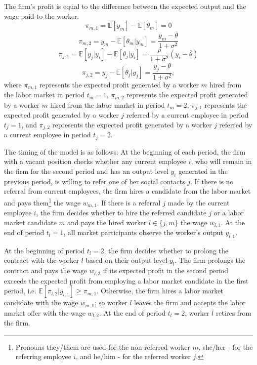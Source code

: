 \documentclass[12pt]{article}
\begin{document}
The firm's profit is equal to the difference between the expected output and the wage paid to the worker.
\begin{equation}\label{eq_pi_m_1}
    \pi_{m,1} = \mathbb{E}[y_m]-\mathbb{E}[\theta_m] = 0
\end{equation}
\begin{equation}\label{eq_pi_m_2}
    \pi_{m,2} = y_m - \mathbb{E}[\theta_m|y_m] = \frac{y_m-\bar{\theta}}{1+\sigma^2}
\end{equation}
\begin{equation}\label{eq_pi_j_1}
    \pi_{j,1} = \mathbb{E}[y_j|y_i]-\mathbb{E}[\theta_j|y_i] = \frac{\rho}{1+\sigma^2}(y_i-\bar{\theta})
\end{equation}
\begin{equation}\label{eq_pi_j_2}
    \pi_{j,2} = y_j - \mathbb{E}[\theta_j|y_j] = \frac{y_j-\bar{\theta}}{1+\sigma^2},
\end{equation}
where $\pi_{m,1}$ represents the expected profit generated by a worker $m$ hired from the labor market in period $t_m = 1$, $\pi_{m,2}$ represents the expected profit generated by a worker $m$ hired from the labor market in period $t_m = 2$, $\pi_{j,1}$ represents the expected profit generated by a worker $j$ referred by a current employee in period $t_j = 1$, and $\pi_{j,2}$ represents the expected profit generated by a worker $j$ referred by a current employee in period $t_j = 2$.

The timing of the model is as follows: At the beginning of each period, the firm with a vacant position checks whether any current employee $i$, who will remain in the firm for the second period and has an output level $y_i$ generated in the previous period, is willing to refer one of her social contacts $j$. If there is no referral from current employees, the firm hires a candidate from the labor market and pays them\footnote{Pronouns they/them are used for the non-referred worker $m$, she/her - for the referring employee $i$, and he/him - for the referred worker $j$.} the wage $w_{m,1}$. If there is a referral $j$ made by the current employee $i$, the firm decides whether to hire the referred candidate $j$ or a labor market candidate $m$ and pays the hired worker $l \in \lbrace j,m \rbrace$ the wage $w_{l,1}$. At the end of period $t_l = 1$, all market participants observe  the worker's output $y_{l,1}$. %

At the beginning of period $t_l =2$, the firm decides whether to prolong the contract with the worker $l$ based on their output level $y_l$. The firm prolongs the contract and pays the wage $w_{l,2}$ if its expected profit in the second period exceeds the expected profit from employing a labor market candidate in the first period, i.e. $\mathbb{E}[\pi_{l,2}|y_{l,1}] \geq \pi_{m,1}$. Otherwise, the firm hires a labor market candidate with the wage $w_{m,1}$; so worker $l$ leaves the firm and accepts the labor market offer with the wage $w_{l,2}$. At the end of period $t_l = 2$, worker $l$ retires from the firm.
\end{document}
